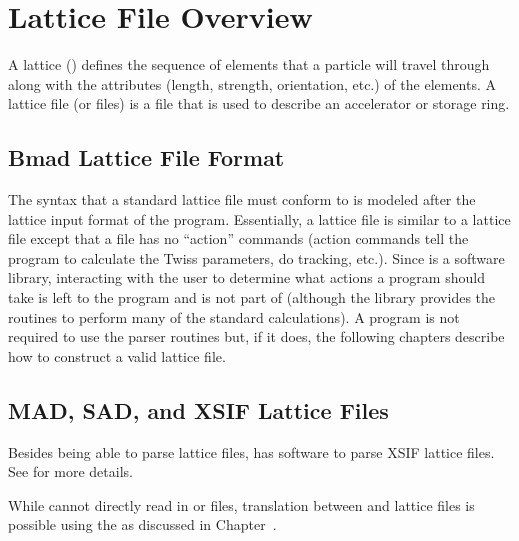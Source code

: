 \chapter{Lattice File Overview}
\label{c:lat.file}

A lattice () defines the sequence of elements
that a particle will travel through along with the attributes (length,
strength, orientation, etc.) of the elements.  A lattice file (or
files) is a file that is used to describe an accelerator or storage
ring. 

\section{Bmad Lattice File Format}
\label{s:lattice.file.formats}

The syntax that a \bmad standard lattice file must conform to is
modeled after the lattice input format of the \mad program.
Essentially, a \bmad lattice file is similar to a \mad lattice file
except that a \bmad file has no ``action'' commands (action commands
tell the program to calculate the Twiss parameters, do tracking,
etc.).  Since \bmad is a software library, interacting with the user
to determine what actions a program should take is left to the program
and is not part of \bmad (although the \bmad library provides the
routines to perform many of the standard calculations). A program is
not required to use the \bmad parser routines but, if it does, the
following chapters describe how to construct a valid lattice file.

\section{MAD, SAD, and XSIF Lattice Files}
\label{s:mad.xsif}

Besides being able to parse \bmad lattice files, \bmad has software to
parse XSIF\cite{b:xsif} lattice files. See  for
more details.

While \bmad cannot directly read in \mad\cite{b:maduser} or
\cite{b:sad} files, translation between \mad and \bmad lattice
files is possible using the  as
discussed in Chapter~.

\newpage

